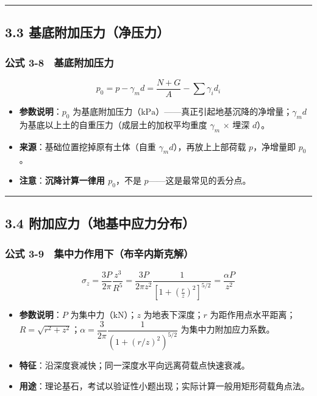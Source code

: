 \documentclass[
]{article}
\providecommand{\tightlist}{%
  \setlength{\itemsep}{0pt}\setlength{\parskip}{0pt}}
\begin{document}
\begin{center}\rule{0.5\linewidth}{0.5pt}\end{center}

\subsection{3.3
基底附加压力（净压力）}\label{ux57faux5e95ux9644ux52a0ux538bux529bux51c0ux538bux529b}

\subsubsection{公式
3-8　基底附加压力}\label{ux516cux5f0f-3-8-ux57faux5e95ux9644ux52a0ux538bux529b}

\[p_0=p-\gamma_m d=\frac{N+G}{A}-\sum\gamma_i d_i\]

\begin{itemize}
\tightlist
\item
  \textbf{参数说明}：\(p_0\)
  为基底附加压力（\(\mathrm{kPa}\)）------真正引起地基沉降的净增量；\(\gamma_m d\)
  为基底以上土的自重压力（成层土的加权平均重度 \(\gamma_m\) × 埋深
  \(d\)）。
\item
  \textbf{来源}：基础位置挖掉原有土体（自重
  \(\gamma_m d\)），再放上上部荷载 \(p\)，净增量即 \(p_0\)。
\item
  \textbf{注意}：\textbf{沉降计算一律用 \(p_0\)}，不是
  \(p\)------这是最常见的丢分点。
\end{itemize}

\begin{center}\rule{0.5\linewidth}{0.5pt}\end{center}

\subsection{3.4
附加应力（地基中应力分布）}\label{ux9644ux52a0ux5e94ux529bux5730ux57faux4e2dux5e94ux529bux5206ux5e03}

\subsubsection{公式
3-9　集中力作用下（布辛内斯克解）}\label{ux516cux5f0f-3-9-ux96c6ux4e2dux529bux4f5cux7528ux4e0bux5e03ux8f9bux5185ux65afux514bux89e3}

\[\sigma_z=\frac{3P}{2\pi}\frac{z^3}{R^5}=\frac{3P}{2\pi z^2}\frac{1}{\left[1+\left(\frac{r}{z}\right)^2\right]^{5/2}}=\frac{\alpha P}{z^2}\]

\begin{itemize}
\tightlist
\item
  \textbf{参数说明}：\(P\) 为集中力（\(\mathrm{kN}\)）；\(z\)
  为地表下深度；\(r\)
  为距作用点水平距离；\(R=\sqrt{r^2+z^2}\)；\(\alpha=\dfrac{3}{2\pi}\dfrac{1}{(1+(r/z)^2)^{5/2}}\)
  为集中力附加应力系数。
\item
  \textbf{特征}：沿深度衰减快；同一深度水平向远离荷载点快速衰减。
\item
  \textbf{用途}：理论基石，考试以验证性小题出现；实际计算一般用矩形荷载角点法。
\end{itemize}
\end{document}
